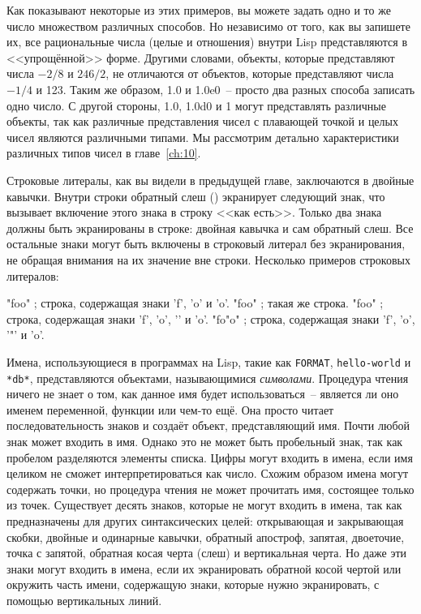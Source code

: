 Как показывают некоторые из этих примеров, вы можете задать одно и то же число множеством
различных способов. Но независимо от того, как вы запишете их, все рациональные числа
(целые и отношения) внутри Lisp представляются в <<упрощённой>> форме. Другими словами,
объекты, которые представляют числа $-2/8$ и $246/2$, не отличаются от объектов, которые
представляют числа $-1/4$ и 123. Таким же образом, 1.0 и 1.0e0~-- просто два разных способа
записать одно число. С другой стороны, 1.0, 1.0d0 и 1 могут представлять различные
объекты, так как различные представления чисел с плавающей точкой и целых чисел являются
различными типами. Мы рассмотрим детально характеристики различных типов чисел в главе~\ref{ch:10}.

Строковые литералы, как вы видели в предыдущей главе, заключаются в двойные
кавычки. Внутри строки обратный слеш (\bslash) экранирует следующий знак, что
вызывает включение этого знака в строку <<как есть>>. Только два знака должны быть
экранированы в строке: двойная кавычка и сам обратный слеш. Все остальные знаки могут быть
включены в строковый литерал без экранирования, не обращая внимания на их значение вне
строки. Несколько примеров строковых литералов:

\begin{myverb}
"foo"     ; строка, содержащая знаки 'f', 'o' и 'o'.
"fo\bslash{}o"    ; такая же строка.
"fo\bslash{}\bslash{}o"   ; строка, содержащая знаки 'f', 'o', '\bslash{}' и 'o'.
"fo\bslash{}"o"   ; строка, содержащая знаки 'f', 'o', '"' и 'o'.
\end{myverb}

Имена, использующиеся в программах на Lisp, такие как \lstinline{FORMAT}, \lstinline{hello-world}
и \lstinline{*db*}, представляются объектами, называющимися \textit{символами}. Процедура чтения
ничего не знает о том, как данное имя будет использоваться~-- является ли оно именем
переменной, функции или чем-то ещё. Она просто читает последовательность знаков и создаёт
объект, представляющий имя. Почти любой знак может входить в имя. Однако это не может быть
пробельный знак, так как пробелом разделяются элементы списка. Цифры могут входить в
имена, если имя целиком не сможет интерпретироваться как число. Схожим образом имена
могут содержать точки, но процедура чтения не может прочитать имя, состоящее только из
точек. Существует десять знаков, которые не могут входить в имена, так как предназначены
для других синтаксических целей: открывающая и закрывающая скобки, двойные и одинарные
кавычки, обратный апостроф, запятая, двоеточие, точка с запятой, обратная косая черта
(слеш) и вертикальная черта. Но даже эти знаки могут входить в имена, если их экранировать
обратной косой чертой или окружить часть имени, содержащую знаки, которые нужно
экранировать, с помощью вертикальных линий.

